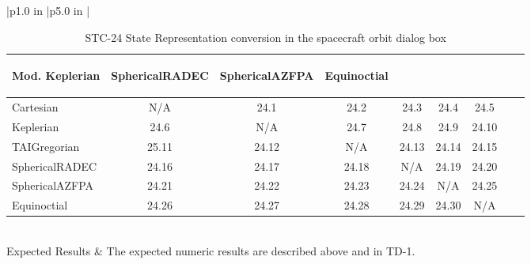 \begin{table}[htbp!]
\begin{tabular}{|p{1.0 in} |p{5.0 in} |}
\begin{centering}
\begin{tabular}{|l|c|c|c|c|c|c|c|c|}
             {\begin{sideways}\parbox{2.9cm}{Mod. Keplerian}\end{sideways}} &
             {\begin{sideways}\parbox{2.9cm}{SphericalRADEC}\end{sideways}} &
             {\begin{sideways}\parbox{2.9cm}{SphericalAZFPA}\end{sideways}}  &
             {\begin{sideways}\parbox{2.9cm}{Equinoctial}\end{sideways}}  \\ \hline
             Cartesian & N/A & 24.1 & 24.2 & 24.3 & 24.4 & 24.5\\ \hline
             Keplerian & 24.6 & N/A & 24.7 & 24.8 & 24.9 & 24.10 \\ \hline
             TAIGregorian & 25.11 & 24.12 & N/A & 24.13 & 24.14 & 24.15 \\ \hline
             SphericalRADEC & 24.16 & 24.17 & 24.18 & N/A & 24.19 & 24.20 \\ \hline
             SphericalAZFPA & 24.21 & 24.22 & 24.23 & 24.24 & N/A & 24.25 \\ \hline
             Equinoctial & 24.26 & 24.27 & 24.28 & 24.29 & 24.30 &  N/A\\ \hline
          \end{tabular}
          \end{centering} \vspace{0.1 in}\\
         \hline
         Expected Results & The expected numeric results are described above and in TD-1.\\
      \hline
\end{tabular}
   \label{Table:STC-24}
   \caption{STC-24 State Representation conversion in the spacecraft orbit dialog box}
\end{table} 
